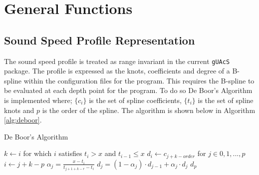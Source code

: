 \documentclass{article}
\begin{document}
\section{General Functions}
\subsection{Sound Speed Profile Representation}
The sound speed profile is treated as range invariant in the current \texttt{gUAcS} package. The profile is expressed as the knots, coefficients and degree of a B-spline within the configuration files for the program. This requires the B-spline to be evaluated at each depth point for the program. To do so De Boor's Algorithm is implemented where; $\{c_{i}\}$ is the set of spline coefficients, $\{t_{i}\}$ is the set of spline knots and $p$ is the order of the spline. The algorithm is shown below in Algorithm \ref{alg:deboor}.
\begin{algorithm}[H]
  \caption{De Boor's Algorithm}
  \label{alg:deboor}
  \begin{algorithmic}
    \State $k\gets i$ for which $i$ satisfies $t_{i} > x$ and $t_{i-1} \leq x$
    \State $d_i\gets c_{j + k -order}$ for $j\in{0,1,...,p}$
        \State $i\gets j + k - p$
        \State $\alpha_j = \frac{x - t_i}{t_{j + 1 + k - r} - t_{i}}$
        \State $d_j = (1 - \alpha_j)\cdot d_{j-1} + \alpha_j\cdot d_{j}$
      \EndFor
    \EndFor
    \Return $d_{p}$
  \end{algorithmic}
\end{algorithm}


\nocite{*}
\printbibliography
\end{document}
